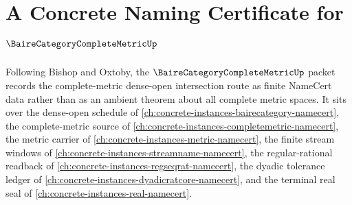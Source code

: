\chapter{A Concrete Naming Certificate for $\BaireCategoryCompleteMetricUp$}
\label{ch:concrete-instances-baire-category-complete-metric-namecert}

Following Bishop and Oxtoby, the $\BaireCategoryCompleteMetricUp$ packet records the complete-metric dense-open intersection route as finite NameCert data rather than as an ambient theorem about all complete metric spaces. It sits over the dense-open schedule of \autoref{ch:concrete-instances-bairecategory-namecert}, the complete-metric source of \autoref{ch:concrete-instances-completemetric-namecert}, the metric carrier of \autoref{ch:concrete-instances-metric-namecert}, the finite stream windows of \autoref{ch:concrete-instances-streamname-namecert}, the regular-rational readback of \autoref{ch:concrete-instances-regseqrat-namecert}, the dyadic tolerance ledger of \autoref{ch:concrete-instances-dyadicratcore-namecert}, and the terminal real seal of \autoref{ch:concrete-instances-real-namecert}.

